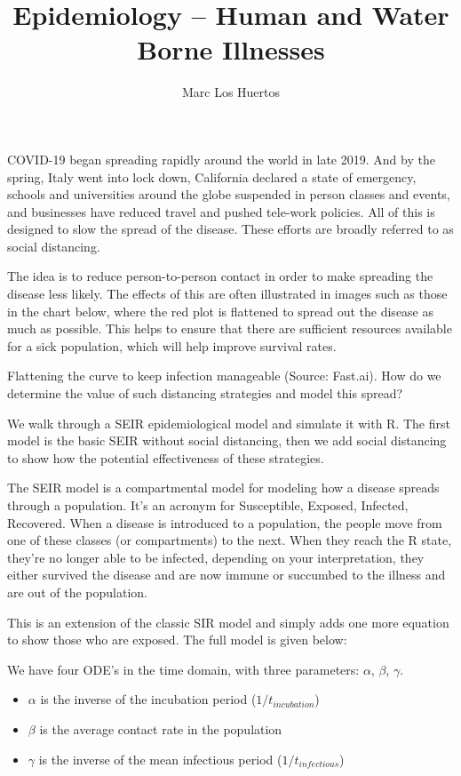 \documentclass{article}\usepackage[]{graphicx}\usepackage[]{color}
\title{Epidemiology -- Human and Water Borne Illnesses}
\author{Marc Los Huertos}
\begin{document}
\maketitle

COVID-19 began spreading rapidly around the world in late 2019. And by the spring, Italy went into lock down, California declared a state of emergency, schools and universities around the globe suspended in person classes and events, and businesses have reduced travel and pushed tele-work policies. All of this is designed to slow the spread of the disease. These efforts are broadly referred to as social distancing.

The idea is to reduce person-to-person contact in order to make spreading the disease less likely. The effects of this are often illustrated in images such as those in the chart below, where the red plot is flattened to spread out the disease as much as possible. This helps to ensure that there are sufficient resources available for a sick population, which will help improve survival rates.

Flattening the curve to keep infection manageable (Source: Fast.ai).
How do we determine the value of such distancing strategies and model this spread?


We walk through a SEIR epidemiological model and simulate it with R. The first model is the basic SEIR without social distancing, then we add social distancing to show how the potential effectiveness of these strategies.

The SEIR model is a compartmental model for modeling how a disease spreads through a population. It's an acronym for Susceptible, Exposed, Infected, Recovered. When a disease is introduced to a population, the people move from one of these classes (or compartments) to the next. When they reach the R state, they’re no longer able to be infected, depending on your interpretation, they either survived the disease and are now immune or succumbed to the illness and are out of the population.

This is an extension of the classic SIR model and simply adds one more equation to show those who are exposed. The full model is given below:

We have four ODE's in the time domain, with three parameters: $\alpha$, $\beta$, $\gamma$.

\begin{itemize}

\item $\alpha$ is the inverse of the incubation period ($1/t_{incubation}$)
\item $\beta$ is the average contact rate in the population
\item $\gamma$ is the inverse of the mean infectious period ($1/t_{infectious}$)

\end{itemize}
\end{document}

